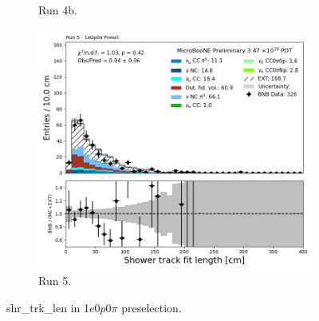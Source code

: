 \begin{figure}[H]
\begin{subfigure}[t]{0.32\linewidth}
        \caption{Run 4b.}
    \end{subfigure}%
    \hspace{0.2cm}%
    \begin{subfigure}[t]{0.32\linewidth}
        \includegraphics[width=\linewidth]{technote/Appendix_Preselection/Figures/1e0p0pi/Run5/shr_trk_len_Run5_1e0p0pi_Presel.png}
        \caption{Run 5.}
    \end{subfigure}
    \caption{shr\_trk\_len in 1$e$0$p$0$\pi$ preselection.}
\end{figure}